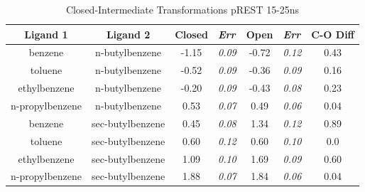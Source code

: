 \documentclass[journal=jctcce,manuscript=article]{achemso}
\begin{document}
\begin{table}[!htb]
\centering
\caption{Closed-Intermediate Transformations pREST 15-25ns}
\label{tbl:C-I_pRESText}
\begin{tabular}{|c|c|c|l|c|l|c|}
\hline
\textbf{Ligand 1}                       & \textbf{Ligand 2}                        & {\color[HTML]{800080} \textbf{Closed}} & {\color[HTML]{800080} \textit{Err}} & {\color[HTML]{008000} \textbf{Open}} & {\color[HTML]{008000} \textit{Err}} & \textbf{C-O Diff}            \\ \hline
\cellcolor[HTML]{800080}benzene         & \cellcolor[HTML]{00FFFF}n-butylbenzene   & -1.15                                   & \textit{0.09}                       & -0.72                                & \textit{0.12}                       & \cellcolor[HTML]{FFCCC9}0.43 \\ \hline
\cellcolor[HTML]{800080}toluene         & \cellcolor[HTML]{00FFFF}n-butylbenzene   & -0.52                                  & \textit{0.09}                       & -0.36                                & \textit{0.09}                       & \cellcolor[HTML]{9AFF99}0.16 \\ \hline
\cellcolor[HTML]{800080}ethylbenzene    & \cellcolor[HTML]{00FFFF}n-butylbenzene   & -0.20                                   & \textit{0.09}                       & -0.43                                & \textit{0.08}                       & \cellcolor[HTML]{9AFF99}0.23 \\ \hline
\cellcolor[HTML]{800080}n-propylbenzene & \cellcolor[HTML]{00FFFF}n-butylbenzene   & 0.53                                  & \textit{0.07}                       & 0.49                                 & \textit{0.06}                       & \cellcolor[HTML]{9AFF99}0.04 \\ \hline
\cellcolor[HTML]{800080}benzene         & \cellcolor[HTML]{00FFFF}sec-butylbenzene & 0.45                                   & \textit{0.08}                       & 1.34                                 & \textit{0.12}                       & \cellcolor[HTML]{9AFF99}0.89 \\ \hline
\cellcolor[HTML]{800080}toluene         & \cellcolor[HTML]{00FFFF}sec-butylbenzene & 0.60                                   & \textit{0.12}                       & 0.60                                 & \textit{0.10}                       & \cellcolor[HTML]{9AFF99}0.0 \\ \hline
\cellcolor[HTML]{800080}ethylbenzene    & \cellcolor[HTML]{00FFFF}sec-butylbenzene & 1.09                                   & \textit{0.10}                       & 1.69                                 & \textit{0.09}                       & \cellcolor[HTML]{9AFF99}0.60 \\ \hline
\cellcolor[HTML]{800080}n-propylbenzene & \cellcolor[HTML]{00FFFF}sec-butylbenzene & 1.88                                   & \textit{0.07}                       & 1.84                                 & \textit{0.06}                       & \cellcolor[HTML]{9AFF99}0.04 \\ \hline
\end{tabular}
\end{table}
\end{document}
